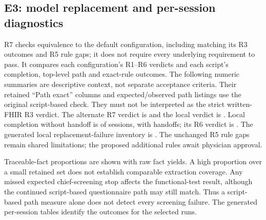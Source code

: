 \subsection{E3: model replacement and per-session diagnostics}
R7 checks equivalence to the default configuration, including matching its
R3 outcomes and R5 rule gaps; it does not require every underlying requirement to pass.
It compares each configuration's R1--R6 verdicts and each script's completion,
top-level path and exact-rule outcomes. The following numeric summaries are
descriptive context, not separate acceptance criteria. Their retained ``Path
exact'' columns and expected/observed path listings use the original script-based
check. They must not be interpreted as the strict written-FHIR R3 verdict.
The alternate R7 verdict is \EThreeAlternateSwapVerdict{} and the local verdict
is \EThreeLocalSwapVerdict{}. Local completion without handoff is
\EThreeLocalCompleted{} of \EThreeLocalSessions{} sessions, with
\EThreeLocalHandoffs{} handoffs; its R6 verdict is \EThreeLocalRSixVerdict{}.
The generated local replacement-failure inventory is
\EThreeLocalSwapFailingScripts{}. The unchanged R5 rule gaps remain shared
limitations; the proposed additional rules await physician approval.








Traceable-fact proportions are shown with raw fact yields. A high proportion over
a small retained set does not establish comparable extraction coverage. Any missed expected chief-screening stop affects the functional-test result,
although the continued script-based questionnaire path may still match. Thus a
script-based path measure alone does not detect every screening failure. The
generated per-session tables identify the outcomes for the selected runs.

